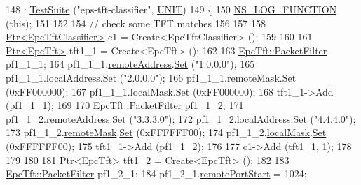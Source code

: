 \begin{DoxyCode}
148   : \hyperlink{classns3_1_1TestSuite_a904b0c40583b744d30908aeb94636d1a}{TestSuite} (\textcolor{stringliteral}{"eps-tft-classifier"}, \hyperlink{classns3_1_1TestSuite_a1ebfcab34ec8161e085e8e3a1855eae0a3885375a3787abf60431f8454b3cadbd}{UNIT})
149 \{
150   \hyperlink{log-macros-disabled_8h_a90b90d5bad1f39cb1b64923ea94c0761}{NS\_LOG\_FUNCTION} (\textcolor{keyword}{this});
151 
152 
154   \textcolor{comment}{// check some TFT matches}
156 \textcolor{comment}{}
157   
158   \hyperlink{classns3_1_1Ptr}{Ptr<EpcTftClassifier>} c1 = Create<EpcTftClassifier> ();
159   
160 
161   \hyperlink{classns3_1_1Ptr}{Ptr<EpcTft>} tft1\_1 = Create<EpcTft> ();
162 
163   \hyperlink{structns3_1_1EpcTft_1_1PacketFilter}{EpcTft::PacketFilter} pf1\_1\_1;
164   pf1\_1\_1.\hyperlink{structns3_1_1EpcTft_1_1PacketFilter_ac6b6b05436c19e55a9d64ff5d8ace9e5}{remoteAddress}.\hyperlink{classns3_1_1Ipv4Address_a7204982c2906b7df3f73739ca472dacb}{Set} (\textcolor{stringliteral}{"1.0.0.0"});
165   pf1\_1\_1.localAddress.Set (\textcolor{stringliteral}{"2.0.0.0"});
166   pf1\_1\_1.remoteMask.Set (0xFF000000);
167   pf1\_1\_1.localMask.Set (0xFF000000);
168   tft1\_1->Add (pf1\_1\_1);
169 
170   \hyperlink{structns3_1_1EpcTft_1_1PacketFilter}{EpcTft::PacketFilter} pf1\_1\_2;
171   pf1\_1\_2.\hyperlink{structns3_1_1EpcTft_1_1PacketFilter_ac6b6b05436c19e55a9d64ff5d8ace9e5}{remoteAddress}.\hyperlink{classns3_1_1Ipv4Address_a7204982c2906b7df3f73739ca472dacb}{Set} (\textcolor{stringliteral}{"3.3.3.0"});
172   pf1\_1\_2.\hyperlink{structns3_1_1EpcTft_1_1PacketFilter_a091832baf650c7396dfedd456a847a06}{localAddress}.\hyperlink{classns3_1_1Ipv4Address_a7204982c2906b7df3f73739ca472dacb}{Set} (\textcolor{stringliteral}{"4.4.4.0"});
173   pf1\_1\_2.\hyperlink{structns3_1_1EpcTft_1_1PacketFilter_a776b963c9555b388893c5aaab0856afb}{remoteMask}.\hyperlink{classns3_1_1Ipv4Mask_a33e4ed6fe734d4432bdf279c176975a2}{Set} (0xFFFFFF00);
174   pf1\_1\_2.\hyperlink{structns3_1_1EpcTft_1_1PacketFilter_a419c4f19d00518a9bff3756859306c0b}{localMask}.\hyperlink{classns3_1_1Ipv4Mask_a33e4ed6fe734d4432bdf279c176975a2}{Set} (0xFFFFFF00);
175   tft1\_1->Add (pf1\_1\_2);
176 
177   c1->\hyperlink{classns3_1_1EpcTftClassifier_a4a0dd2623dd9bfbfb806183625af74bd}{Add} (tft1\_1, 1);
178 
179 
180 
181   \hyperlink{classns3_1_1Ptr}{Ptr<EpcTft>} tft1\_2 = Create<EpcTft> ();
182 
183   \hyperlink{structns3_1_1EpcTft_1_1PacketFilter}{EpcTft::PacketFilter} pf1\_2\_1;
184   pf1\_2\_1.\hyperlink{structns3_1_1EpcTft_1_1PacketFilter_aa96ab9356c91b14059220d00155c32b5}{remotePortStart} = 1024;

\end{DoxyCode}
